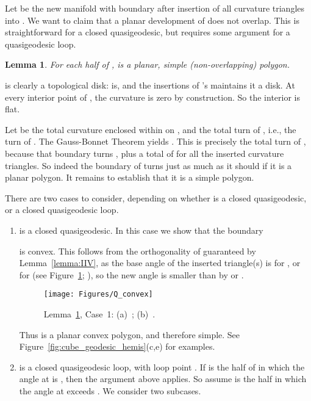 \pdfoutput=1  \documentclass[]{article}
\newcommand{\hide}[1]{}
\newcommand{\ABox}{
\raisebox{3pt}{\framebox[6pt]{\rule{6pt}{0pt}}}
}
\newenvironment{proof}{{\bf Proof:}}{\hfill\ABox}
\newtheorem{lemma}[theorem]{Lemma}
\newcommand{\lemlab}[1]{\label{lemma:#1}}
\newcommand{\figlab}[1]{\label{fig:#1}}
\newcommand{\lemref}[1]{\ref{lemma:#1}}
\newcommand{\figref}[1]{\ref{fig:#1}}
\begin{document}
Let  be
the new manifold with boundary after insertion of all 
curvature triangles into .
We want to claim that a planar development of  does not
overlap.  This is straightforward for a closed quasigeodesic,
but requires some argument for a quasigeodesic loop.
\begin{lemma}
For each half  of ,
 is a planar, simple (non-overlapping) polygon.
\lemlab{convex.polygon}
\end{lemma}
\begin{proof}
 is clearly a topological disk:  is, and the insertions of 's
maintains it a disk.
At every interior point of , the curvature is zero by construction.
So the interior is flat.

Let  be the total curvature enclosed within  on ,
and  the total turn of , i.e., the turn of .
The Gauss-Bonnet Theorem yields .
This is precisely the total turn of , because
that boundary turns , plus a total of  for all the
inserted curvature triangles.
So indeed the boundary of  turns just as much as it should
if it is a planar polygon.  It remains to establish
that it is a simple polygon.

There are two cases to consider,
depending on whether  is a closed quasigeodesic, or a closed
quasigeodesic loop.
\begin{enumerate}
\item  is a closed quasigeodesic.
In this case we show that the boundary 

is convex.
This follows from the orthogonality of  guaranteed by Lemma~\lemref{IIV},
as the base angle of the inserted triangle(s) is
 for ,
or  for 
(see Figure~\figref{Q_convex}; ),
so the new angle is smaller than  by  or .
\begin{figure}[htbp]
\centering
\texttt{[image: Figures/Q\_convex]}
\caption{Lemma~\protect\lemref{convex.polygon}, Case~1: 
(a)~; (b)~.}
\figlab{Q_convex}
\end{figure}
Thus  is a planar convex polygon, and therefore simple.
See Figure~\figref{cube_geodesic_hemis}(c,e) for examples.

\hide{
Note that, when the total curvature in  is 
then the straight development
of  is turned  by the  insertions,
as in~(b) of the figure.
When the total curvature in  is ,
the development of  is not straight, but the  insertions
turn it exactly the additional amount needed to close it to ,
as in~(d) of the figure.
}


\item  is a closed quasigeodesic loop, with loop point .
If  is the half of  in which the angle at  is ,
then the argument above applies.
So assume  is the half in which the angle  at  exceeds .
We consider two subcases.


\end{enumerate}
\end{proof}
\end{document}
